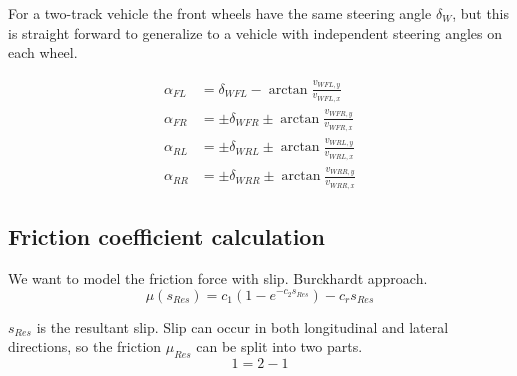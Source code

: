 For a two-track vehicle the front wheels have the same steering angle $\delta_W$, but this is straight forward to generalize to a vehicle with independent steering angles on each wheel.

\begin{align*}
    \alpha_{FL} &= \delta_{WFL} - \arctan{\frac{v_{WFL,y}}{v_{WFL,x}}} \\
    \alpha_{FR} &= \pm \delta_{WFR} \pm  \arctan{\frac{v_{WFR,y}}{v_{WFR,x}}} \\
    \alpha_{RL} &= \pm \delta_{WRL} \pm \arctan{\frac{v_{WRL,y}}{v_{WRL,x}}} \\
    \alpha_{RR} &= \pm \delta_{WRR} \pm \arctan{\frac{v_{WRR,y}}{v_{WRR,x}}}
\end{align*}



\subsection{Friction coefficient calculation}

We want to model the friction force with slip. 
Burckhardt approach.
\begin{equation}
    \mu(s_{Res}) = c_1 \left( 1 - e^{-c_2 s_{Res}} \right) - c_r s_{Res}
\end{equation}

$s_{Res}$ is the resultant slip. Slip can occur in both longitudinal and lateral directions, so the friction $\mu_{Res}$ can be split into two parts.
\begin{equation}
   1 = 2 - 1
\end{equation}
